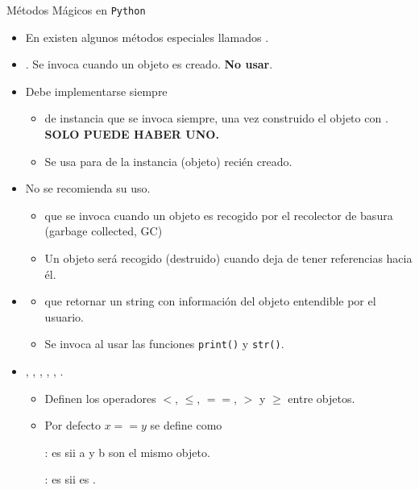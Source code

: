 \documentclass[10pt,envcountsect,spanish]{beamer}
\begin{document}
\begin{frame}[fragile=singleslide]{Métodos Mágicos en {\tt Python}}
\begin{itemize}
\item En  existen algunos métodos especiales llamados .
\item {}. Se invoca cuando un objeto es creado.  \textbf{No usar}.

\item {} Debe implementarse siempre
	\begin{itemize}
	\item {} de instancia que se invoca siempre, una vez construido el objeto con . \textbf{SOLO PUEDE HABER UNO.}
	\item Se usa para  de la instancia (objeto) recién creado.
	\end{itemize}


\item {} No se recomienda su uso.
	\begin{itemize}
	\item {} que se invoca cuando un objeto es recogido por el recolector de basura (garbage collected, GC)
	\item Un objeto será recogido (destruido) cuando deja de tener referencias hacia él.
	\end{itemize}
	
\item  {} 
	\begin{itemize}
	\item {} que retornar un string con información del objeto entendible por el usuario.
	\item Se invoca al usar las funciones \texttt{print()} y \texttt{str()}.
	\end{itemize}

\item {},
,
,
,
,
. 	

\begin{itemize}
\item
Definen los operadores $<$, $\leq$, $==$, $>$ y $\geq$ entre objetos.

\item 
Por defecto $x==y$ se define como 

 : es  sii a y b son el mismo objeto.

\cmbox{==} : es  sii  es .
\end{itemize}
\end{itemize}



\end{frame}
\end{document}
